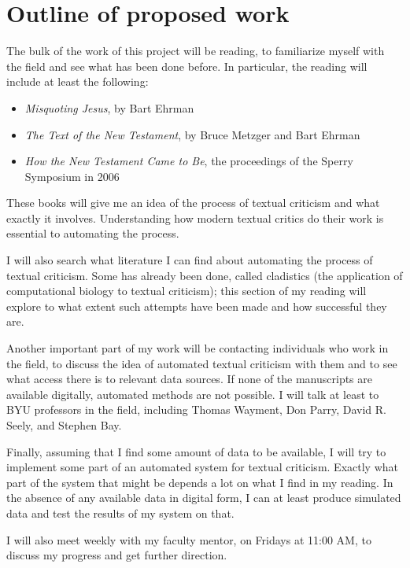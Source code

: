 \documentclass[onecolumn, 11pt]{article}
\begin{document}
\section{Outline of proposed work}

The bulk of the work of this project will be reading, to familiarize myself
with the field and see what has been done before.  In particular, the reading
will include at least the following:

\begin{itemize}
  \item \emph{Misquoting Jesus}, by Bart Ehrman
  \item \emph{The Text of the New Testament}, by Bruce Metzger and Bart Ehrman
  \item \emph{How the New Testament Came to Be}, the proceedings of the Sperry
	Symposium in 2006
\end{itemize}

These books will give me an idea of the process of textual criticism and what
exactly it involves.  Understanding how modern textual critics do their work is
essential to automating the process.

I will also search what literature I can find about automating the process of
textual criticism.  Some has already been done, called cladistics (the
application of computational biology to textual criticism); this section of my
reading will explore to what extent such attempts have been made and how
successful they are.

Another important part of my work will be contacting individuals who work in
the field, to discuss the idea of automated textual criticism with them and to
see what access there is to relevant data sources.  If none of the manuscripts
are available digitally, automated methods are not possible.  I will talk at
least to BYU professors in the field, including Thomas Wayment, Don Parry,
David R. Seely, and Stephen Bay.

Finally, assuming that I find some amount of data to be available, I will try
to implement some part of an automated system for textual criticism.  Exactly
what part of the system that might be depends a lot on what I find in my
reading.  In the absence of any available data in digital form, I can at least
produce simulated data and test the results of my system on that.

I will also meet weekly with my faculty mentor, on Fridays at 11:00 AM, to
discuss my progress and get further direction.
\end{document}
